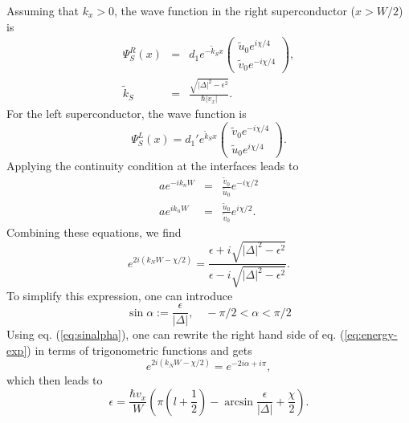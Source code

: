 Assuming that $k_x > 0$, the wave function in the right superconductor ($x > W/2$) is
\begin{eqnarray}
\Psi_S^R \left( x \right) &=& d_1 e^{ - \tilde{k}_S x } \begin{pmatrix} \tilde{u}_0 e^{i \chi/4} \\ \tilde{v}_0 e^{-i \chi/4} \end{pmatrix},\\
\tilde{k}_S  &=& \frac{\sqrt{|\Delta|^2 - \epsilon^2 }}{\hbar |v_x|}.
\end{eqnarray}
For the left superconductor, the wave function is
\begin{equation}
 \Psi_S^L \left( x \right) = d_1' e^{ \tilde{k}_S x } \begin{pmatrix} \tilde{v}_0 e^{-i \chi / 4}\\ \tilde{u}_0 e^{i \chi / 4} \end{pmatrix}.
\end{equation}
Applying the continuity condition at the interfaces leads to
\begin{eqnarray}
a e^{-i k_n W} &=& \frac{\tilde{v}_0}{\tilde{u}_0} e^{-i \chi /2}  \\
a e^{i k_n W} &=& \frac{\tilde{u}_0}{\tilde{v}_0} e^{i \chi /2}.
\end{eqnarray}
Combining these equations, we find
\begin{equation}
e^{2i ( k_N W - \chi /2 )}  = \frac{\epsilon + i \sqrt{|\Delta|^2 - \epsilon^2 }}{ \epsilon - i \sqrt{|\Delta|^2 - \epsilon^2 } } \label{eq:energy-exp}.
\end{equation}
To simplify this expression, one can introduce 
\begin{equation}
\sin \alpha := \frac{\epsilon}{|\Delta|}, \quad - \pi / 2 < \alpha < \pi / 2\label{eq:sinalpha}
\end{equation}
Using eq. (\ref{eq:sinalpha}), one can rewrite the right hand side of eq. (\ref{eq:energy-exp}) in terms of trigonometric functions and gets
\begin{equation}
e^{2i ( k_N W - \chi /2 )} = e^{-2i \alpha + i \pi},
\end{equation}
which then leads to
\begin{equation}
\epsilon = \frac{\hbar v_x}{W} \left( \pi \left(l + \frac{1}{2} \right) - \arcsin \frac{\epsilon}{|\Delta|} + \frac{\chi}{2} \right).
\end{equation}
